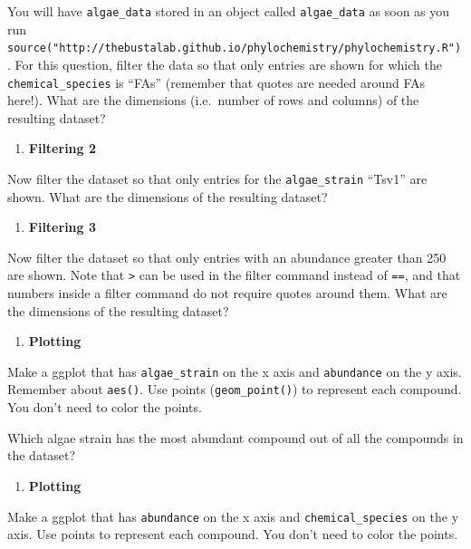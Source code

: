 \documentclass[
]{krantz}
\providecommand{\tightlist}{%
  \setlength{\itemsep}{0pt}\setlength{\parskip}{0pt}}
\begin{document}
You will have \texttt{algae\_data} stored in an object called \texttt{algae\_data} as soon as you run \texttt{source("http://thebustalab.github.io/phylochemistry/phylochemistry.R")}. For this question, filter the data so that only entries are shown for which the \texttt{chemical\_species} is ``FAs'' (remember that quotes are needed around FAs here!). What are the dimensions (i.e.~number of rows and columns) of the resulting dataset?

\begin{enumerate}
\def\labelenumi{\arabic{enumi}.}
\setcounter{enumi}{1}
\tightlist
\item
  \textbf{Filtering 2}
\end{enumerate}

Now filter the dataset so that only entries for the \texttt{algae\_strain} ``Tsv1'' are shown. What are the dimensions of the resulting dataset?

\begin{enumerate}
\def\labelenumi{\arabic{enumi}.}
\setcounter{enumi}{2}
\tightlist
\item
  \textbf{Filtering 3}
\end{enumerate}

Now filter the dataset so that only entries with an abundance greater than 250 are shown. Note that \texttt{\textgreater{}} can be used in the filter command instead of \texttt{==}, and that numbers inside a filter command do not require quotes around them. What are the dimensions of the resulting dataset?

\begin{enumerate}
\def\labelenumi{\arabic{enumi}.}
\setcounter{enumi}{3}
\tightlist
\item
  \textbf{Plotting}
\end{enumerate}

Make a ggplot that has \texttt{algae\_strain} on the x axis and \texttt{abundance} on the y axis. Remember about \texttt{aes()}. Use points (\texttt{geom\_point()}) to represent each compound. You don't need to color the points.

Which algae strain has the most abundant compound out of all the compounds in the dataset?

\begin{enumerate}
\def\labelenumi{\arabic{enumi}.}
\setcounter{enumi}{4}
\tightlist
\item
  \textbf{Plotting}
\end{enumerate}

Make a ggplot that has \texttt{abundance} on the x axis and \texttt{chemical\_species} on the y axis. Use points to represent each compound. You don't need to color the points.
\end{document}
